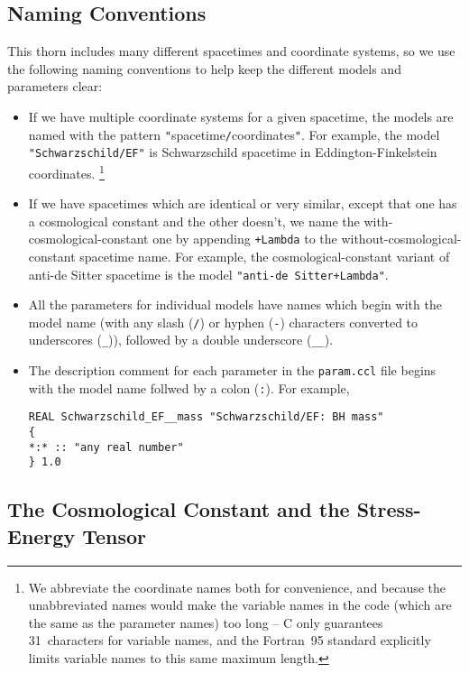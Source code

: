 \subsection{Naming Conventions}

This thorn includes many different spacetimes and coordinate systems,
so we use the following naming conventions to help keep the different
models and parameters clear:
\begin{itemize}
\item	If we have multiple coordinate systems for a given spacetime,
	the models are named with the pattern
	\hbox{{\tt "}spacetime{\tt /}coordinates{\tt "}}.
	For example, the model \verb|"Schwarzschild/EF"| is Schwarzschild
	spacetime in Eddington-Finkelstein coordinates.%
\footnote{%
	 We abbreviate the coordinate names both for
	 convenience, and because the unabbreviated
	 names would make the variable names in the
	 code (which are the same as the parameter names)
	 too long -- C only guarantees 31~characters for
	 variable names, and the Fortran~95 standard
	 explicitly limits variable names to this same
	 maximum length.
	 }%
\item	If we have spacetimes which are identical or very similar,
	except that one has a cosmological constant and the other
	doesn't, we name the with-cosmological-constant one by appending
	\verb|+Lambda| to the without-cosmological-constant spacetime
	name.  For example, the cosmological-constant variant of
	anti-de Sitter spacetime is the model \verb|"anti-de Sitter+Lambda"|.
\item	All the parameters for individual models have names which begin
	with the model name (with any slash (\verb|/|) or hyphen (\verb|-|)
	characters converted to underscores (\verb|_|)), followed by
	a double underscore (\verb|__|).
\item	The description comment for each parameter in the \verb|param.ccl|
	file begins with the model name follwed by a colon (\verb|:|).
	For example,
\begin{verbatim}
REAL Schwarzschild_EF__mass "Schwarzschild/EF: BH mass"
{
*:* :: "any real number"
} 1.0
\end{verbatim}
\end{itemize}


\subsection{The Cosmological Constant and the Stress-Energy Tensor}
\label{AEIThorns/Exact/cosmological-constant+stress-energy-tensor}


